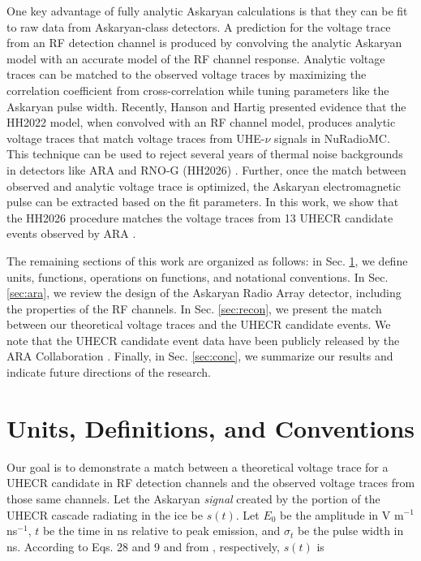 \documentclass[amsmath,amssymb,aps,prd,10pt,twocolumn,showkeys]{revtex4}
\begin{document}
One key advantage of fully analytic Askaryan calculations is that they can be fit to raw data from Askaryan-class detectors.  A prediction for the voltage trace from an RF detection channel is produced by convolving the analytic Askaryan model with an accurate model of the RF channel response.  Analytic voltage traces can be matched to the observed voltage traces by maximizing the correlation coefficient from cross-correlation while tuning parameters like the Askaryan pulse width.  Recently, Hanson and Hartig presented evidence that the HH2022 model, when convolved with an RF channel model, produces analytic voltage traces that match voltage traces from UHE-$\nu$ signals in NuRadioMC.  This technique can be used to reject several years of thermal noise backgrounds in detectors like ARA and RNO-G (HH2026) \cite{10.1140/epjc/s10052-020-7612-8,hanson2026complex-a31}.  Further, once the match between observed and analytic voltage trace is optimized, the Askaryan electromagnetic pulse can be extracted based on the fit parameters.  In this work, we show that the HH2026 procedure matches the voltage traces from 13 UHECR candidate events observed by ARA \cite{xwqy-yzrk}.

The remaining sections of this work are organized as follows: in Sec. \ref{sec:unit}, we define units, functions, operations on functions, and notational conventions.  In Sec. \ref{sec:ara}, we review the design of the Askaryan Radio Array detector, including the properties of the RF channels.  In Sec. \ref{sec:recon}, we present the match between our theoretical voltage traces and the UHECR candidate events.  We note that the UHECR candidate event data have been publicly released by the ARA Collaboration \cite{url}.  Finally, in Sec. \ref{sec:conc}, we summarize our results and indicate future directions of the research.

\section{Units, Definitions, and Conventions}
\label{sec:unit}

Our goal is to demonstrate a match between a theoretical voltage trace for a UHECR candidate in RF detection channels and the observed voltage traces from those same channels.  Let the Askaryan \textit{signal} created by the portion of the UHECR cascade radiating in the ice be $s(t)$.  Let $E_0$ be the amplitude in V m$^{-1}$ ns$^{-1}$, $t$ be the time in ns relative to peak emission, and $\sigma_t$ be the pulse width in ns.  According to Eqs. 28 and 9 and from \cite{PhysRevD.105.123019,hanson2026complex-a31}, respectively, $s(t)$ is 
\end{document}

